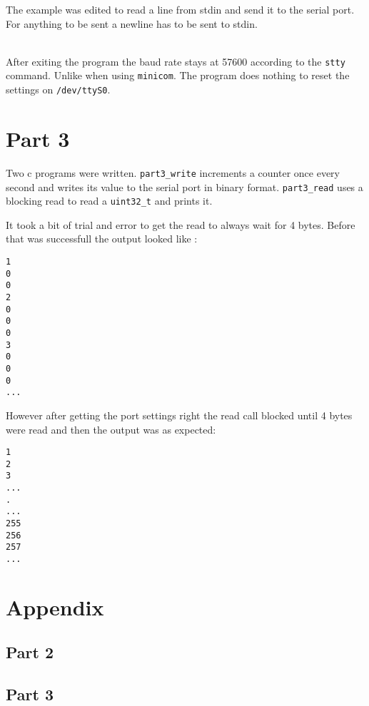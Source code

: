 \documentclass{article}
\begin{document}
The example was edited to read a line from stdin and send it to the serial port. For anything to be sent a newline has to be sent to stdin.

\\
After exiting the program the baud rate stays at 57600 according to the \verb"stty" command. Unlike when using \verb"minicom". The program does nothing to reset the settings on \verb"/dev/ttyS0".



\section*{Part 3}
Two c programs were written. \verb!part3_write! increments a counter once every second and writes its value to the serial port in binary format. \verb!part3_read! uses a blocking read to read a \verb!uint32_t! and prints it.

It took a bit of trial and error to get the read to always wait for 4 bytes. Before that was successfull the output looked like :
\begin{verbatim}
1
0
0
2
0
0
0
3
0
0
0
...
\end{verbatim}
 
 However after getting the port settings right the read call blocked until 4 bytes were read and then the output was as expected:
 \begin{verbatim}
1
2
3
...
.
...
255
256
257
...
 \end{verbatim}

\section*{Appendix}
\appendix
\subsection*{Part 2}\label{appendix:part2}

\subsection*{Part 3}\label{appendix:part3}

\end{document}
